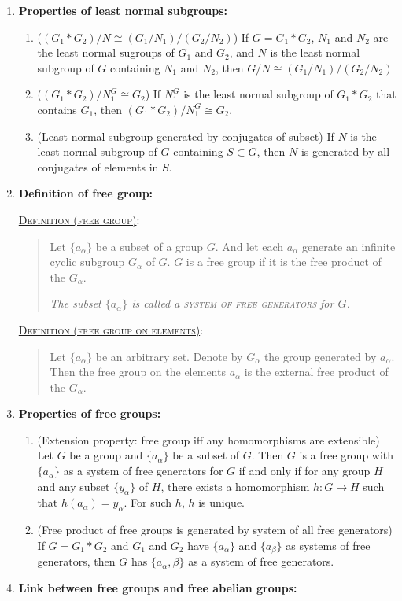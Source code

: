 \documentclass[letterpaper, 12pt]{book}
\newcommand{\defn}[2]{\textsc{\underline{Definition (#1)}:}\begin{quote} #2\end{quote}}
\begin{document}
\begin{enumerate}[resume]
        \defn{least normal subgroup}{If $S$ is a subset of $G$, the least normal subgroup of $G$ that contains $S$ is the intersection $N$ of all normal subgroups of $G$ that contain $S$.}
    \item \textbf{Properties of least normal subgroups:}
        \begin{enumerate}
        \item ($(G_1*G_2)/N\cong (G_1/N_1) / (G_2/N_2)$) If $G = G_1*G_2$, $N_1$ and $N_2$ are the least normal sugroups of $G_1$ and $G_2$, and $N$ is the least normal subgroup of $G$ containing $N_1$ and $N_2$, then $G/N \cong (G_1/N_1) / (G_2/N_2)$
        \item ($(G_1*G_2)/N_1^G\cong G_2$) If $N_1^G$ is the least normal subgroup of $G_1*G_2$ that contains $G_1$, then $(G_1*G_2)/N_1^G\cong G_2$.
        \item (Least normal subgroup generated by conjugates of subset) If $N$ is the least normal subgroup of $G$ containing $S\subset G$, then $N$ is generated by all conjugates of elements in $S$.
        \end{enumerate}
    \item \textbf{Definition of free group:}
        
        \defn{free group}{Let $\{a_\alpha\}$ be a subset of a group $G$. And let each $a_\alpha$ generate an infinite cyclic subgroup $G_\alpha$ of $G$. $G$ is a free group if it is the free product of the $G_\alpha$.

        \textit{The subset $\{a_\alpha\}$ is called a \textsc{system of free generators} for $G$.}}

        \defn{free group on elements}{Let $\{a_\alpha\}$ be an arbitrary set. Denote by $G_\alpha$ the group generated by $a_\alpha$. Then the free group on the elements $a_\alpha$ is the external free product of the $G_\alpha$.}
    \item \textbf{Properties of free groups:}
        \begin{enumerate}
        \item (Extension property: free group iff any homomorphisms are extensible) Let $G$ be a group and $\{a_\alpha\}$ be a subset of $G$. Then $G$ is a free group with $\{a_\alpha\}$ as a system of free generators for $G$ if and only if for any group $H$ and any subset $\{y_\alpha\}$ of $H$, there exists a homomorphism $h: G\to H$ such that $h(a_\alpha) = y_\alpha$. For such $h$, $h$ is unique.
        \item (Free product of free groups is generated by system of all free generators) If $G = G_1 * G_2$ and $G_1$ and $G_2$ have $\{a_\alpha\}$ and $\{a_\beta\}$ as systems of free generators, then $G$ has $\{a_\alpha,\beta\}$ as a system of free generators.
        \end{enumerate}
    \item \textbf{Link between free groups and free abelian groups:}


\end{enumerate}
\end{document}
